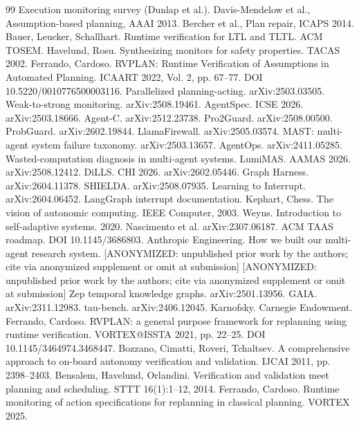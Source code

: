 \documentclass[acmsmall,screen,review,anonymous]{acmart}
\begin{document}
\begin{thebibliography}{99}
 Execution monitoring survey (Dunlap et al.).
 Davis-Mendelow et al., Assumption-based planning, AAAI 2013.
 Bercher et al., Plan repair, ICAPS 2014.
 Bauer, Leucker, Schallhart. Runtime verification for LTL and TLTL. ACM TOSEM.
 Havelund, Rosu. Synthesizing monitors for safety properties. TACAS 2002.
 Ferrando, Cardoso. RVPLAN: Runtime Verification of Assumptions in Automated Planning. ICAART 2022, Vol. 2, pp. 67--77. DOI 10.5220/0010776500003116.
 Parallelized planning-acting. arXiv:2503.03505.
 Weak-to-strong monitoring. arXiv:2508.19461.
 AgentSpec. ICSE 2026. arXiv:2503.18666.
 Agent-C. arXiv:2512.23738.
 Pro2Guard. arXiv:2508.00500.
 ProbGuard. arXiv:2602.19844.
 LlamaFirewall. arXiv:2505.03574.
 MAST: multi-agent system failure taxonomy. arXiv:2503.13657.
 AgentOps. arXiv:2411.05285.
 Wasted-computation diagnosis in multi-agent systems.
 LumiMAS. AAMAS 2026. arXiv:2508.12412.
 DiLLS. CHI 2026. arXiv:2602.05446.
 Graph Harness. arXiv:2604.11378.
 SHIELDA. arXiv:2508.07935.
 Learning to Interrupt. arXiv:2604.06452.
 LangGraph interrupt documentation.
 Kephart, Chess. The vision of autonomic computing. IEEE Computer, 2003.
 Weyns. Introduction to self-adaptive systems. 2020.
 Nascimento et al. arXiv:2307.06187.
 ACM TAAS roadmap. DOI 10.1145/3686803.
 Anthropic Engineering. How we built our multi-agent research system.
 [ANONYMIZED: unpublished prior work by the authors; cite via anonymized supplement or omit at submission]
 [ANONYMIZED: unpublished prior work by the authors; cite via anonymized supplement or omit at submission]
 Zep temporal knowledge graphs. arXiv:2501.13956.
 GAIA. arXiv:2311.12983.
 tau-bench. arXiv:2406.12045.
 Karnofsky. Carnegie Endowment.
 Ferrando, Cardoso. RVPLAN: a general purpose framework for replanning using runtime verification. VORTEX@ISSTA 2021, pp. 22--25. DOI 10.1145/3464974.3468447.
 Bozzano, Cimatti, Roveri, Tchaltsev. A comprehensive approach to on-board autonomy verification and validation. IJCAI 2011, pp. 2398--2403.
 Bensalem, Havelund, Orlandini. Verification and validation meet planning and scheduling. STTT 16(1):1--12, 2014.
 Ferrando, Cardoso. Runtime monitoring of action specifications for replanning in classical planning. VORTEX 2025.
\end{thebibliography}
\end{document}

